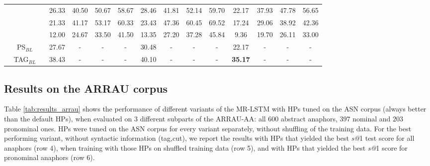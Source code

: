 \documentclass[11pt,letterpaper]{article}
\newcommand{\cmark}{\ding{51}}\newcommand{\xmark}{\ding{55}}
\begin{document}
\begin{table*}[t]
{\begin{tabular}{c|c|c|c|c|c|cccc|cccc|cccc}
{\color{darkred} \xmark} & {\color{darkred} \xmark} & {\color{darkred} \xmark} & {\color{darkred} \xmark} & {\color{darkgreen} \cmark} & {\color{darkgreen} \cmark} & 26.33 & 40.50 & 50.67 & 58.67 & 28.46 & 41.81 & 52.14 & 59.70 & 22.17 & 37.93 & 47.78 & 56.65 \\
{\color{darkgreen} \cmark} & {\color{darkgreen} \cmark} & {\color{darkgreen} \cmark} & {\color{darkgreen} \cmark} & {\color{darkred} \xmark} & {\color{darkgreen} \cmark} &  21.33 & 41.17 & 53.17 & 60.33 & 23.43 & 47.36 & 60.45 & 69.52 & 17.24 & 29.06 & 38.92 & 42.36 \\
{\color{darkgreen} \cmark} & {\color{darkgreen} \cmark} & {\color{darkgreen} \cmark} & {\color{darkgreen} \cmark} & {\color{darkgreen} \cmark} & {\color{darkred} \xmark} &  12.00 & 24.67 & 33.50 & 41.50 & 13.35 & 27.20 & 37.28 & 45.84 & 9.36  & 19.70 & 26.11 & 33.00 \\
\midrule  
\multicolumn{6}{c|}{PS$_{BL}$} &  27.67   &  -     &    -   &     -  &30.48   &   -    &    -   &    -   & 22.17   &    -   &   -    &     -  \\
\multicolumn{6}{c|}{TAG$_{BL}$} &  38.43& -     & -     & -     & 40.10 & -     & -     & -     & \textbf{35.17} & -     & -     & - \\
\bottomrule
\end{tabular}
}
\caption{Results table for the ARRAU-AA test set. Refer to text for explanation of duplicated rows.}\label{tab:results_arrau}
\end{table*}















 
\subsection{Results on the ARRAU corpus}

Table \ref{tab:results_arrau} shows the performance of different variants of the MR-LSTM with HPs tuned on the ASN corpus (always better than the default HPs), when evaluated on $3$ different subparts of the ARRAU-AA: all $600$ abstract anaphors, $397$ nominal and $203$ pronominal ones. HPs were tuned on the ASN corpus for every variant separately, without shuffling of the training data. For the best performing variant, without syntactic information (tag,cut), we report the results with HPs that yielded the best \textit{s@}1 test score for all anaphors (row 4), when training with those HPs on shuffled training data (row 5), and with HPs that yielded the best \textit{s@}1 score for pronominal anaphors (row 6).
\end{document}

